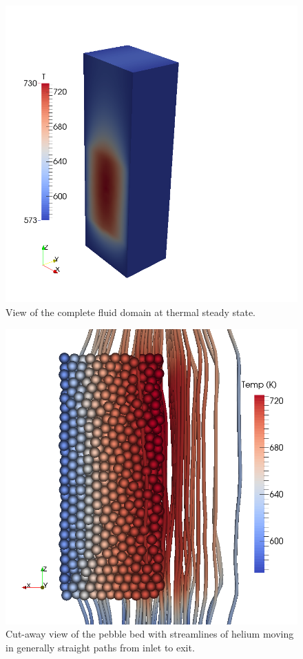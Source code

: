 \begin{figure}[t]
    \centering
    \includegraphics[width=\singleimagewidth]{figures/full-cfd-dem-fluid-temp}
    \caption{View of the complete fluid domain at thermal steady state.}\label{fig:cfdem-complete-domain}
\end{figure}


\begin{figure}[t]
    \centering
    \includegraphics[width=\singleimagewidth]{figures/cfd-dem-streamlines2}
    \caption{Cut-away view of the pebble bed with streamlines of helium moving in generally straight paths from inlet to exit.}\label{fig:cfdem-streamlines}
\end{figure}


